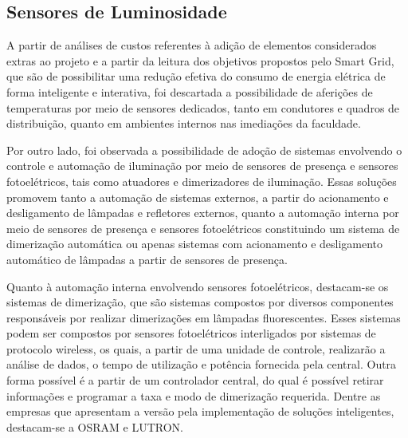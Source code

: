 \subsection{Sensores de Luminosidade}
A partir de análises de custos referentes à adição de elementos considerados extras ao projeto e a partir da leitura dos objetivos propostos pelo Smart Grid, que são de possibilitar uma redução efetiva do consumo de energia elétrica de forma inteligente e interativa, foi descartada a possibilidade de aferições de temperaturas por meio de sensores dedicados, tanto em condutores e quadros de distribuição, quanto em ambientes internos nas imediações da faculdade. 

Por outro lado, foi observada a possibilidade de adoção de sistemas envolvendo o controle e automação de iluminação por meio de sensores de presença e sensores fotoelétricos, tais como atuadores e dimerizadores de iluminação. Essas soluções promovem tanto a automação de sistemas externos, a partir do acionamento e desligamento de lâmpadas e refletores externos, quanto a automação interna por meio de sensores de presença e sensores fotoelétricos constituindo um sistema de dimerização automática ou apenas sistemas com acionamento e desligamento automático de lâmpadas a partir de sensores de presença.

Quanto à automação interna envolvendo sensores fotoelétricos, destacam-se os sistemas de dimerização, que são sistemas compostos por diversos componentes responsáveis por realizar dimerizações em lâmpadas fluorescentes. Esses sistemas podem ser compostos por sensores fotoelétricos interligados por sistemas de protocolo wireless, os quais, a partir de uma unidade de controle, realizarão a análise de dados, o tempo de utilização e potência fornecida pela central. Outra forma possível é a partir de um controlador central, do qual é possível retirar informações e programar a taxa e modo de dimerização requerida. Dentre as empresas que apresentam a versão pela implementação de soluções inteligentes, destacam-se a OSRAM e LUTRON. 

